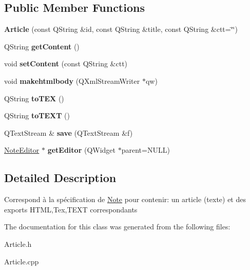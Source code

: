 \subsection*{\-Public \-Member \-Functions}
\begin{DoxyCompactItemize}
\item 
\hypertarget{classArticle_a52709bc8511c58d4a7e3c975a42a4c45}{{\bfseries \-Article} (const \-Q\-String \&id, const \-Q\-String \&title, const \-Q\-String \&ctt=\char`\"{}\char`\"{})}\label{classArticle_a52709bc8511c58d4a7e3c975a42a4c45}

\item 
\hypertarget{classArticle_a070b8ab5ea1422f53a50b7ab35ec9a75}{\-Q\-String {\bfseries get\-Content} ()}\label{classArticle_a070b8ab5ea1422f53a50b7ab35ec9a75}

\item 
\hypertarget{classArticle_a5052d0c9a07f637bbbfbc3d0eac4d216}{void {\bfseries set\-Content} (const \-Q\-String \&ctt)}\label{classArticle_a5052d0c9a07f637bbbfbc3d0eac4d216}

\item 
\hypertarget{classArticle_a138e8393aeab078d015e133a71976fc8}{void {\bfseries makehtmlbody} (\-Q\-Xml\-Stream\-Writer $\ast$qw)}\label{classArticle_a138e8393aeab078d015e133a71976fc8}

\item 
\hypertarget{classArticle_ade6e2228c6e152b0f8a76b8a805c772f}{\-Q\-String {\bfseries to\-T\-E\-X} ()}\label{classArticle_ade6e2228c6e152b0f8a76b8a805c772f}

\item 
\hypertarget{classArticle_ae7abb57cd2860a012971498cbb210cb2}{\-Q\-String {\bfseries to\-T\-E\-X\-T} ()}\label{classArticle_ae7abb57cd2860a012971498cbb210cb2}

\item 
\hypertarget{classArticle_abf96d5e7b1841cc629e16e9dbab65fde}{\-Q\-Text\-Stream \& {\bfseries save} (\-Q\-Text\-Stream \&f)}\label{classArticle_abf96d5e7b1841cc629e16e9dbab65fde}

\item 
\hypertarget{classArticle_ac9ed870803a2b86bb3c3e192e310e13d}{\hyperlink{classNoteEditor}{\-Note\-Editor} $\ast$ {\bfseries get\-Editor} (\-Q\-Widget $\ast$parent=\-N\-U\-L\-L)}\label{classArticle_ac9ed870803a2b86bb3c3e192e310e13d}

\end{DoxyCompactItemize}


\subsection{\-Detailed \-Description}
\-Correspond à la spécification de \hyperlink{classNote}{\-Note} pour contenir\-: un article (texte) et des exports \-H\-T\-M\-L,\-Tex,\-T\-E\-X\-T correspondants 

\-The documentation for this class was generated from the following files\-:\begin{DoxyCompactItemize}
\item 
\-Article.\-h\item 
\-Article.\-cpp\end{DoxyCompactItemize}
